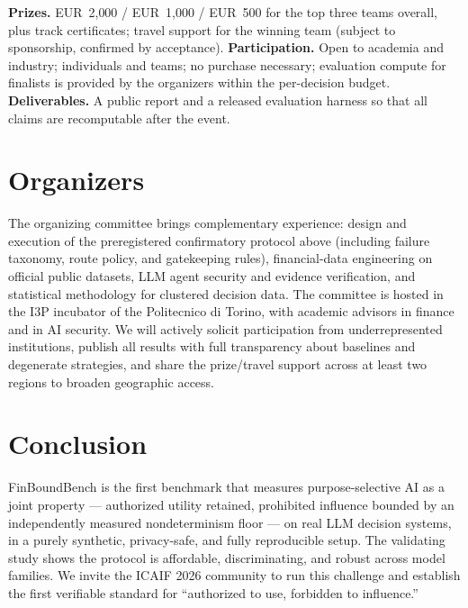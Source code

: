 \documentclass[sigconf,nonacm]{acmart}
\begin{document}
\textbf{Prizes.} EUR~2{,}000 / EUR~1{,}000 / EUR~500 for the top three
teams overall, plus track certificates; travel support for the winning team
(subject to sponsorship, confirmed by acceptance). \textbf{Participation.}
Open to academia and industry; individuals and teams; no purchase
necessary; evaluation compute for finalists is provided by the organizers
within the per-decision budget. \textbf{Deliverables.} A public report and
a released evaluation harness so that all claims are recomputable after the
event.

\section{Organizers}

The organizing committee brings complementary experience: design and
execution of the preregistered confirmatory protocol above (including
failure taxonomy, route policy, and gatekeeping rules), financial-data
engineering on official public datasets, LLM agent security and evidence
verification, and statistical methodology for clustered decision data.
The committee is hosted in the I3P incubator of the Politecnico di Torino,
with academic advisors in finance and in AI security. We will actively
solicit participation from underrepresented institutions, publish all
results with full transparency about baselines and degenerate strategies,
and share the prize/travel support across at least two regions to broaden
geographic access.

\section{Conclusion}

FinBoundBench is the first benchmark that measures purpose-selective AI as a
joint property --- authorized utility retained, prohibited influence bounded
by an independently measured nondeterminism floor --- on real LLM decision
systems, in a purely synthetic, privacy-safe, and fully reproducible setup.
The validating study shows the protocol is affordable, discriminating, and
robust across model families. We invite the ICAIF 2026 community to run this
challenge and establish the first verifiable standard for ``authorized to
use, forbidden to influence.''



\end{document}
